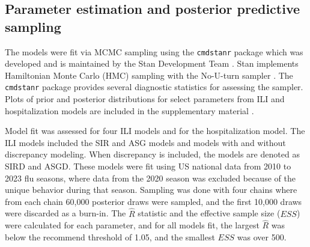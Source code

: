 \subsection{Parameter estimation and posterior predictive sampling}
\label{sec:implementation_posterior}

The models were fit via MCMC sampling using the 
\texttt{cmdstanr} package which was developed and is maintained by the Stan 
Development Team \cite[]{stan2024manual} \cite[]{gabry2022stan}. Stan 
implements Hamiltonian Monte Carlo (HMC) sampling with the No-U-turn 
sampler \cite[]{hoffman2014no}. The \texttt{cmdstanr} package provides 
several diagnostic statistics for assessing the sampler.
Plots of prior and posterior distributions for select parameters from ILI and 
hospitalization models are included in the supplementary material 
\cite[]{wadsworth2024bas}.

Model fit was assessed for four ILI models and for 
the hospitalization model. The ILI models included the SIR and 
ASG models and models with and without discrepancy modeling. When discrepancy 
is included, the models are denoted as SIRD and ASGD. These models were fit 
using US national data from 2010 to 2023 flu seasons, where data from the 
2020 season was excluded because of the unique behavior during that season. 
Sampling was done with four chains where from each chain 
60,000 posterior draws were sampled, and the first 10,000 draws were discarded 
as a burn-in. The $\hat{R}$ statistic \cite[]{vehtari2021rank} and the 
effective sample size ($ESS$) \cite[]{gelman2013bayesian} were calculated for 
each parameter, and for all models fit, the largest $\hat{R}$ was below the 
recommend threshold of 1.05, and the smallest $ESS$ was over 500.

